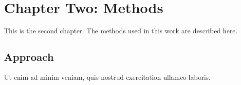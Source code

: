 \section{Chapter Two: Methods}
This is the second chapter.
The methods used in this work are described here.

\subsection{Approach}
Ut enim ad minim veniam, quis nostrud exercitation ullamco laboris.
